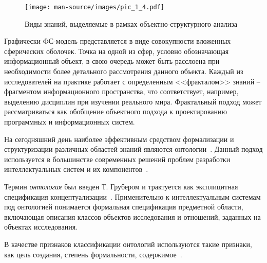 \begin{figure}[H]
\begin{center}
\texttt{[image: man-source/images/pic\_1\_4.pdf]}\\[2mm]
\caption{Виды знаний, выделяемые в рамках объектно-структурного анализа}
\label{pic_1.4}
\end{center}
\end{figure}


Графически ФС-модель представляется в виде совокупности вложенных сферических оболочек. Точка на одной из сфер, условно обозначающая информационный объект, в свою очередь может быть расслоена при необходимости более детального рассмотрения данного объекта. Каждый из исследователей на практике работает с определенным <<фракталом>> знаний – фрагментом информационного пространства, что соответствует, например, выделению дисциплин при изучении реального мира. Фрактальный подход может рассматриваться как обобщение объектного подхода к проектированию программных и информационных систем.

На сегодняшний день наиболее эффективным средством формализации и структуризации различных областей знаний являются онтологии~\cite{Guarino1995}. Данный подход используется в большинстве современных решений проблем разработки интеллектуальных систем и их компонентов~\cite{BorgestRole2014, BorgestVvedenie2014, Gavrilova2016, Gladun2013, Globa2014, Fillipov2016, Efimenko2011, Kleschev2001, Kudruavtsev2010, Lapshin2010, Rubashkin2012, Gruber1995, Guarino1995, Karray2012, Mizoguchi1995, Sowa1995}. 

Термин \textit{онтология} был введен Т. Грубером и трактуется как эксплицитная спецификация концептуализации~\cite{Gruber1995}. Применительно к интеллектуальным системам под онтологией понимается формальная спецификация предметной области, включающая описания классов объектов исследования и отношений, заданных на объектах исследования. 

В качестве признаков классификации онтологий используются такие признаки, как цель создания, степень формальности, содержимое~\cite{Dobrov2006}. 

